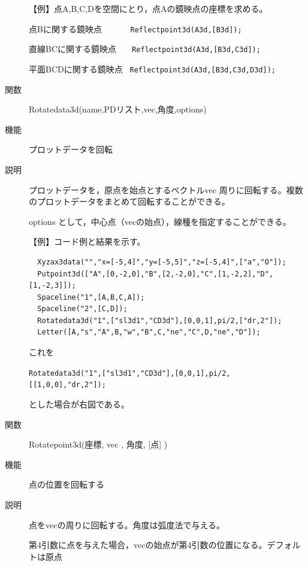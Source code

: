\documentclass[papersize,a4paper,12pt,uplatex]{jsarticle}
\begin{document}
\begin{description}
\vspace{\baselineskip}
【例】点A,B,C,Dを空間にとり，点Aの鏡映点の座標を求める。

点Bに関する鏡映点      \verb|      Reflectpoint3d(A3d,[B3d]);|
    
直線BCに関する鏡映点  \verb|   Reflectpoint3d(A3d,[B3d,C3d]);|
    
平面BCDに関する鏡映点  \verb| Reflectpoint3d(A3d,[B3d,C3d,D3d]);|
 
    
\vspace{\baselineskip}
\hypertarget{rotatedata3d}{}
\item[関数]  Rotatedata3d(name,PDリスト,vec,角度,options)
\item[機能]  プロットデータを回転
\item[説明]  プロットデータを，原点を始点とするベクトルvec 周りに回転する。複数のプロットデータをまとめて回転することができる。

options として，中心点（vecの始点），線種を指定することができる。

\vspace{\baselineskip}
【例】コード例と結果を示す。
\begin{verbatim}
  Xyzax3data("","x=[-5,4]","y=[-5,5]","z=[-5,4]",["a","O"]);
  Putpoint3d(["A",[0,-2,0],"B",[2,-2,0],"C",[1,-2,2],"D",[1,-2,3]]);
  Spaceline("1",[A,B,C,A]);
  Spaceline("2",[C,D]);
  Rotatedata3d("1",["sl3d1","CD3d"],[0,0,1],pi/2,["dr,2"]);
  Letter([A,"s","A",B,"w","B",C,"ne","C",D,"ne","D"]);
\end{verbatim}
これを

  \verb|Rotatedata3d("1",["sl3d1","CD3d"],[0,0,1],pi/2,[[1,0,0],"dr,2"]);|
  
とした場合が右図である。

  \hspace{5mm}  

\vspace{\baselineskip}
\hypertarget{rotatepoint3d}{}
\item[関数]  Rotatepoint3d(座標, vec , 角度, [点] )
\item[機能]  点の位置を回転する
\item[説明]  点をvecの周りに回転する。角度は弧度法で与える。

第4引数に点を与えた場合，vecの始点が第4引数の位置になる。デフォルトは原点


\end{description}
\end{document}
